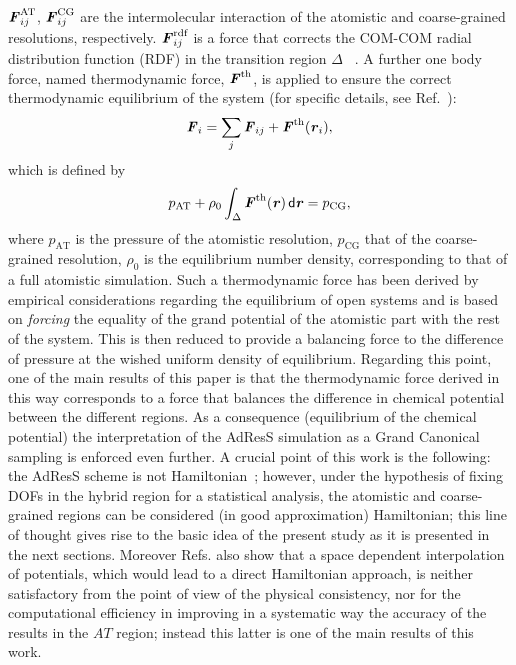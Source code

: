 \documentclass[aip,jcp,a4paper,reprint,onecolumn]{revtex4-1}
\newcommand{\redc}[1]{{\color{red} #1}}
\newcommand{\vect}[1]{\textbf{\textit{#1}}}
\newcommand{\dd}[1]{\textsf{#1}}
\newcommand{\AT}{{\textrm{{AT}}}}
\newcommand{\CG}{{\textrm{CG}}}
\newcommand{\rdf}{{\textrm{rdf}}}
\begin{document}
$ \vect F^{\AT}_{ij}$, $ \vect F^{\CG}_{ij}$
are the intermolecular interaction of the atomistic and coarse-grained
resolutions, respectively.
$\vect F_{ij}^{\rdf}$ is a force that corrects the COM-COM radial distribution function (RDF) in the transition region $\Delta$ ~\cite{rdfcorr}. A further one body force, named thermodynamic force, ${\vect F}^{\textrm{th}}$, is applied to ensure the correct thermodynamic equilibrium of the system (for specific details, see Ref.~):
\begin{equation}
  {\vect F}_{i}=
  \sum_{j}{\vect F}_{ij}+
  {\vect F}^{\textrm{th}}(\vect r_i),
\label{mody}
\end{equation}
which is defined by
\begin{equation}
  p_{\AT}+
  \rho_0
  \int_{\Delta} {\vect F}^\text{th}(\vect r)\,\dd d\vect r
  =p_{\CG},
  \label{thf}
\end{equation}
where $p_{\AT}$ is the pressure of the atomistic resolution, $p_{\CG}$ that of the coarse-grained resolution, $\rho_{0}$ is the equilibrium number density, corresponding to that of a full atomistic simulation.
Such a thermodynamic force has been derived by empirical considerations regarding the equilibrium of open systems and is based on {\it forcing} the equality of the grand potential of the atomistic part with the rest of the system.
This is then reduced to provide a balancing force to the difference of pressure at the wished uniform density of equilibrium. Regarding this point, one of the main results of this paper is that the thermodynamic force derived in this way corresponds to a force that balances the difference in chemical potential between the different regions. As a consequence (equilibrium of the chemical potential) the interpretation of the AdResS simulation as a Grand Canonical sampling is enforced even further.
 A crucial point of this work is the following: the 
AdResS scheme is not Hamiltonian~\cite{presolo,prlcomm}; however, \redc{under the hypothesis of fixing DOFs in the hybrid region for a statistical analysis}, the atomistic and
coarse-grained regions can be considered (in good approximation) Hamiltonian; this line of thought gives rise to the basic
idea of the present study as it is presented in the next sections. \redc{Moreover Refs.\cite{presolo,prlcomm} also show that a space dependent interpolation of potentials, which would lead to a direct Hamiltonian approach, is neither satisfactory from the point of view of the physical consistency, nor for the computational efficiency in improving in a systematic way the accuracy of the results in the $AT$ region; instead this latter is one of the main results of this work.}
\end{document}
